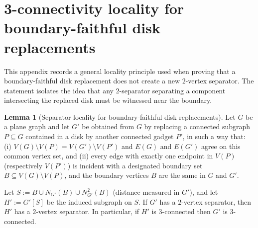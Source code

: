 \documentclass[12pt]{article}
\theoremstyle{definition}
\newtheorem{lemma}[theorem]{Lemma}
\begin{document}
\section{3-connectivity locality for boundary-faithful disk replacements}
\label{app:3conn-locality}

This appendix records a general locality principle used when proving that a boundary-faithful disk replacement
does not create a new $2$-vertex separator. The statement isolates the idea that any $2$-separator separating a
component intersecting the replaced disk must be witnessed near the boundary.
\begin{lemma}[Separator locality for boundary-faithful disk replacements]
\label{lem:separator-locality}
Let $G$ be a plane graph and let $G'$ be obtained from $G$ by replacing a connected subgraph $P\subseteq G$ contained in a disk by another connected gadget $P'$, in such a way that:
(i) $V(G)\setminus V(P)=V(G')\setminus V(P')$ and $E(G)$ and $E(G')$ agree on this common vertex set, and
(ii) every edge with exactly one endpoint in $V(P)$ (respectively $V(P')$) is incident with a designated boundary set $B\subseteq V(G)\setminus V(P)$, and the boundary vertices $B$ are the same in $G$ and $G'$.

Let $S := B \cup N_{G'}(B)\cup N_{G'}^2(B)$ (distance measured in $G'$), and let $H' := G'[S]$ be the induced subgraph on $S$.
If $G'$ has a $2$-vertex separator, then $H'$ has a $2$-vertex separator.
In particular, if $H'$ is $3$-connected then $G'$ is $3$-connected.
\end{lemma}
\end{document}
